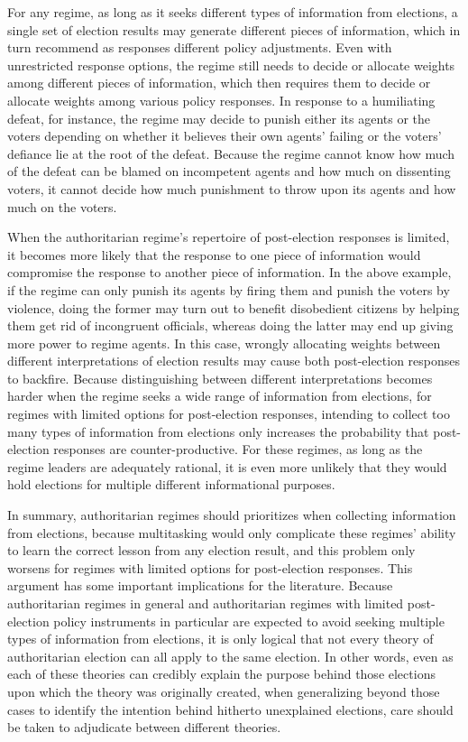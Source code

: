 \documentclass[12pt]{article}
\newcommand{\1}{\mathbbm{1}}
\begin{document}
For any regime, as long as it seeks different types of information from elections, a single set of election results may generate different pieces of information, which in turn recommend as responses different policy adjustments. Even with unrestricted response options, the regime still needs to decide or allocate weights among different pieces of information, which then requires them to decide or allocate weights among various policy responses. In response to a humiliating defeat, for instance, the regime may decide to punish either its agents or the voters depending on whether it believes their own agents' failing or the voters' defiance lie at the root of the defeat. Because the regime cannot know how much of the defeat can be blamed on incompetent agents and how much on dissenting voters, it cannot decide how much punishment to throw upon its agents and how much on the voters.

When the authoritarian regime's repertoire of post-election responses is limited, it becomes more likely that the response to one piece of information would compromise the response to another piece of information. In the above example, if the regime can only punish its agents by firing them and punish the voters by violence, doing the former may turn out to benefit disobedient citizens by helping them get rid of incongruent officials, whereas doing the latter may end up giving more power to regime agents. In this case, wrongly allocating weights between different interpretations of election results may cause both post-election responses to backfire. Because distinguishing between different interpretations becomes harder when the regime seeks a wide range of information from elections, for regimes with limited options for post-election responses, intending to collect too many types of information from elections only increases the probability that post-election responses are counter-productive. For these regimes, as long as the regime leaders are adequately rational, it is even more unlikely that they would hold elections for multiple different informational purposes. 

In summary, authoritarian regimes should prioritizes when collecting information from elections, because multitasking would only complicate these regimes' ability to learn the correct lesson from any election result, and this problem only worsens for regimes with limited options for post-election responses. This argument has some important implications for the literature. Because authoritarian regimes in general and authoritarian regimes with limited post-election policy instruments in particular are expected to avoid seeking multiple types of information from elections, it is only logical that not every theory of authoritarian election can all apply to the same election. In other words, even as each of these theories can credibly explain the purpose behind those elections upon which the theory was originally created, when generalizing beyond those cases to identify the intention behind hitherto unexplained elections, care should be taken to adjudicate between different theories. 
\end{document}
